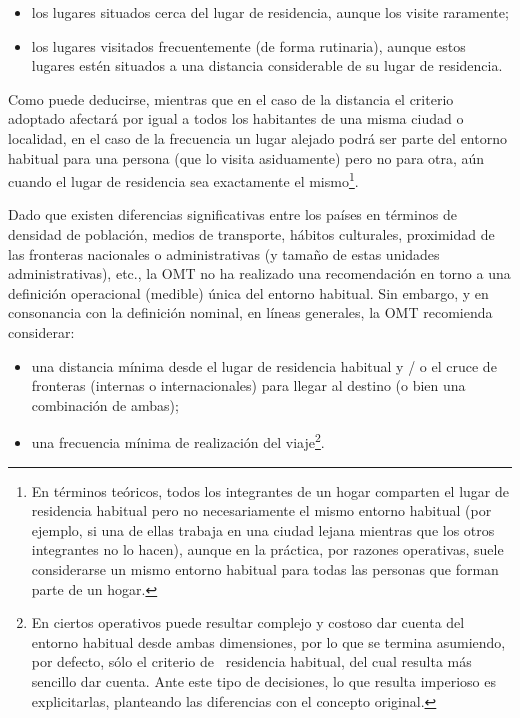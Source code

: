 \documentclass[
  openany]{book}
\begin{document}
\begin{itemize}
\item
  los lugares situados cerca del lugar de residencia, aunque los visite raramente;
\item
  los lugares visitados frecuentemente (de forma rutinaria), aunque estos lugares estén situados a una distancia considerable de su lugar de residencia.
\end{itemize}

Como puede deducirse, mientras que en el caso de la distancia el criterio adoptado afectará por igual a todos los habitantes de una misma ciudad o localidad, en el caso de la frecuencia un lugar alejado podrá ser parte del entorno habitual para una persona (que lo visita asiduamente) pero no para otra, aún cuando el lugar de residencia sea exactamente el mismo\footnote{En términos teóricos, todos los integrantes de un hogar comparten el lugar de residencia habitual pero no necesariamente el mismo entorno habitual (por ejemplo, si una de ellas trabaja en una ciudad lejana mientras que los otros integrantes no lo hacen), aunque en la práctica, por razones operativas, suele considerarse un mismo entorno habitual para todas las personas que forman parte de un hogar.}.

Dado que existen diferencias significativas entre los países en términos de densidad de población, medios de transporte, hábitos culturales, proximidad de las fronteras nacionales o administrativas (y tamaño de estas unidades administrativas), etc., la OMT no ha realizado una recomendación en torno a una definición operacional (medible) única del entorno habitual. Sin embargo, y en consonancia con la definición nominal, en líneas generales, la OMT recomienda considerar:

\begin{itemize}
\item
  una distancia mínima desde el lugar de residencia habitual y / o el cruce de fronteras (internas o internacionales) para llegar al destino (o bien una combinación de ambas);
\item
  una frecuencia mínima de realización del viaje\footnote{En ciertos operativos puede resultar complejo y costoso dar cuenta del entorno habitual desde ambas dimensiones, por lo que se termina asumiendo, por defecto, sólo el criterio de~ residencia habitual, del cual resulta más sencillo dar cuenta. Ante este tipo de decisiones, lo que resulta imperioso es explicitarlas, planteando las diferencias con el concepto original.}.
\end{itemize}
\end{document}
